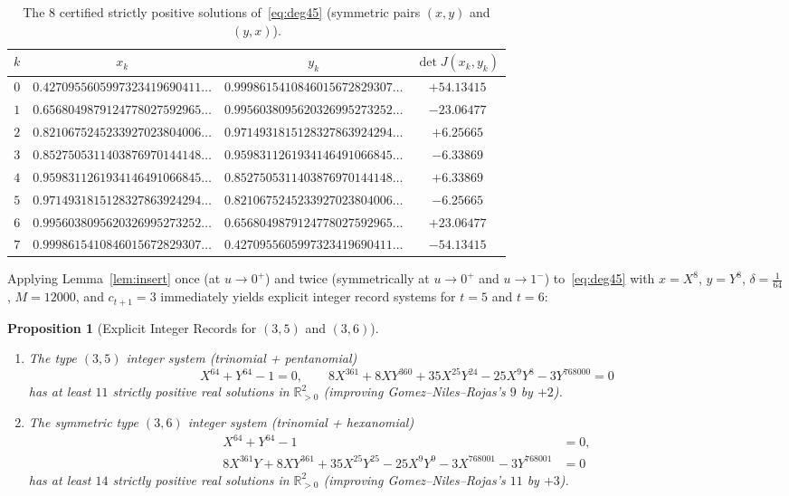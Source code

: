 \documentclass[11pt,a4paper]{amsart}
\newtheorem{proposition}[theorem]{Proposition}
\theoremstyle{remark}
\newcommand{\R}{\mathbb{R}}
\begin{document}
\begin{table}[h]
\centering
\caption{The $8$ certified strictly positive solutions of~\eqref{eq:deg45} (symmetric pairs $(x, y)$ and $(y, x)$).}
\label{tab:roots8}
\begin{tabular}{@{}rccc@{}}
\toprule
$k$ & $x_k$ & $y_k$ & $\det J(x_k, y_k)$ \\
\midrule
$0$ & $0.4270955605997323419690411\dots$ & $0.9998615410846015672829307\dots$ & $+54.13415$ \\
$1$ & $0.6568049879124778027592965\dots$ & $0.9956038095620326995273252\dots$ & $-23.06477$ \\
$2$ & $0.8210675245233927023804006\dots$ & $0.9714931815128327863924294\dots$ & $+6.25665$ \\
$3$ & $0.8527505311403876970144148\dots$ & $0.9598311261934146491066845\dots$ & $-6.33869$ \\
$4$ & $0.9598311261934146491066845\dots$ & $0.8527505311403876970144148\dots$ & $+6.33869$ \\
$5$ & $0.9714931815128327863924294\dots$ & $0.8210675245233927023804006\dots$ & $-6.25665$ \\
$6$ & $0.9956038095620326995273252\dots$ & $0.6568049879124778027592965\dots$ & $+23.06477$ \\
$7$ & $0.9998615410846015672829307\dots$ & $0.4270955605997323419690411\dots$ & $-54.13415$ \\
\bottomrule
\end{tabular}
\end{table}

Applying Lemma~\ref{lem:insert} once (at $u \to 0^+$) and twice (symmetrically at $u \to 0^+$ and $u \to 1^-$) to~\eqref{eq:deg45} with $x = X^8$, $y = Y^8$, $\delta = \frac{1}{64}$, $M = 12000$, and $c_{t+1} = 3$ immediately yields explicit integer record systems for $t = 5$ and $t = 6$:

\begin{proposition}[Explicit Integer Records for $(3, 5)$ and $(3, 6)$]\label{prop:t5t6}
\begin{enumerate}
  \item The type $(3, 5)$ integer system (trinomial + pentanomial)
  \[
    X^{64} + Y^{64} - 1 = 0, \qquad
    8 X^{361} + 8 X Y^{360} + 35 X^{25} Y^{24} - 25 X^9 Y^8 - 3 Y^{768000} = 0
  \]
  has at least $11$ strictly positive real solutions in $\R_{>0}^2$ (improving Gomez--Niles--Rojas's $9$ by $+2$).
  \item The symmetric type $(3, 6)$ integer system (trinomial + hexanomial)
  \begin{align*}
    X^{64} + Y^{64} - 1 &= 0, \\
    8 X^{361} Y + 8 X Y^{361} + 35 X^{25} Y^{25} - 25 X^9 Y^9 - 3 X^{768001} - 3 Y^{768001} &= 0
  \end{align*}
  has at least $14$ strictly positive real solutions in $\R_{>0}^2$ (improving Gomez--Niles--Rojas's $11$ by $+3$).
\end{enumerate}
\end{proposition}
\end{document}
